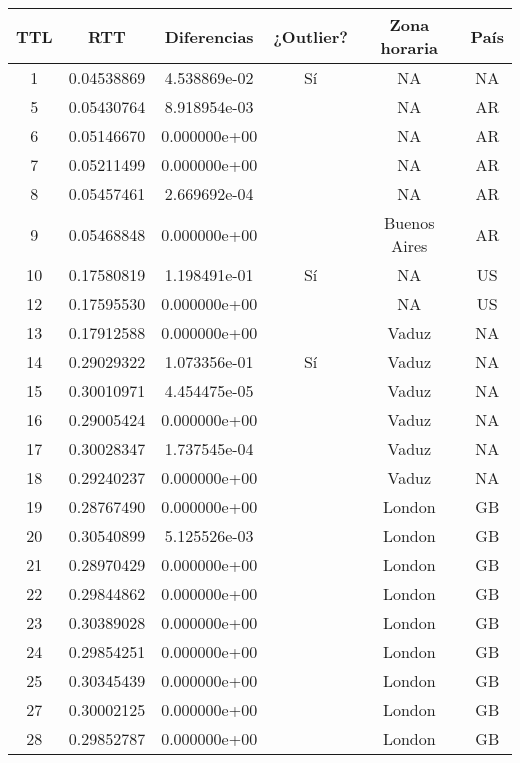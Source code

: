 \begin{center}
\begin{tabular}{cccccc}
TTL & RTT & Diferencias & ¿Outlier? & Zona horaria & País\\
\hline
1 & 0.04538869 & 4.538869e-02 & Sí & NA & NA\\
5 & 0.05430764 & 8.918954e-03 &  & NA & AR\\
6 & 0.05146670 & 0.000000e+00 &  & NA & AR\\
7 & 0.05211499 & 0.000000e+00 &  & NA & AR\\
8 & 0.05457461 & 2.669692e-04 &  & NA & AR\\
9 & 0.05468848 & 0.000000e+00 &  & Buenos Aires & AR\\
10 & 0.17580819 & 1.198491e-01 & Sí & NA & US\\
12 & 0.17595530 & 0.000000e+00 &  & NA & US\\
13 & 0.17912588 & 0.000000e+00 &  & Vaduz & NA\\
14 & 0.29029322 & 1.073356e-01 & Sí & Vaduz & NA\\
15 & 0.30010971 & 4.454475e-05 &  & Vaduz & NA\\
16 & 0.29005424 & 0.000000e+00 &  & Vaduz & NA\\
17 & 0.30028347 & 1.737545e-04 &  & Vaduz & NA\\
18 & 0.29240237 & 0.000000e+00 &  & Vaduz & NA\\
19 & 0.28767490 & 0.000000e+00 &  & London & GB\\
20 & 0.30540899 & 5.125526e-03 &  & London & GB\\
21 & 0.28970429 & 0.000000e+00 &  & London & GB\\
22 & 0.29844862 & 0.000000e+00 &  & London & GB\\
23 & 0.30389028 & 0.000000e+00 &  & London & GB\\
24 & 0.29854251 & 0.000000e+00 &  & London & GB\\
25 & 0.30345439 & 0.000000e+00 &  & London & GB\\
27 & 0.30002125 & 0.000000e+00 &  & London & GB\\
28 & 0.29852787 & 0.000000e+00 &  & London & GB\\
\end{tabular}
\end{center}

